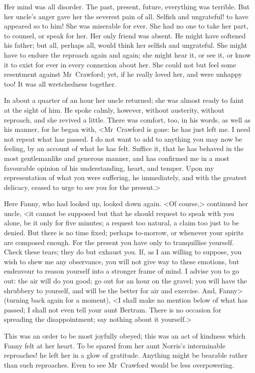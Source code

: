 Her mind was all disorder. The past, present, future, everything was terrible. But her uncle's anger gave her the severest pain of all. Selfish and ungrateful! to have appeared so to him! She was miserable for ever. She had no one to take her part, to counsel, or speak for her. Her only friend was absent. He might have softened his father; but all, perhaps all, would think her selfish and ungrateful. She might have to endure the reproach again and again; she might hear it, or see it, or know it to exist for ever in every connexion about her. She could not but feel some resentment against Mr~Crawford; yet, if he really loved her, and were unhappy too! It was all wretchedness together.

In about a quarter of an hour her uncle returned; she was almost ready to faint at the sight of him. He spoke calmly, however, without austerity, without reproach, and she revived a little. There was comfort, too, in his words, as well as his manner, for he began with, <Mr~Crawford is gone: he has just left me. I need not repeat what has passed. I do not want to add to anything you may now be feeling, by an account of what he has felt. Suffice it, that he has behaved in the most gentlemanlike and generous manner, and has confirmed me in a most favourable opinion of his understanding, heart, and temper. Upon my representation of what you were suffering, he immediately, and with the greatest delicacy, ceased to urge to see you for the present.>

Here Fanny, who had looked up, looked down again. <Of course,> continued her uncle, <it cannot be supposed but that he should request to speak with you alone, be it only for five minutes; a request too natural, a claim too just to be denied. But there is no time fixed; perhaps to-morrow, or whenever your spirits are composed enough. For the present you have only to tranquillise yourself. Check these tears; they do but exhaust you. If, as I am willing to suppose, you wish to shew me any observance, you will not give way to these emotions, but endeavour to reason yourself into a stronger frame of mind. I advise you to go out: the air will do you good; go out for an hour on the gravel; you will have the shrubbery to yourself, and will be the better for air and exercise. And, Fanny> (turning back again for a moment), <I shall make no mention below of what has passed; I shall not even tell your aunt Bertram. There is no occasion for spreading the disappointment; say nothing about it yourself.>

This was an order to be most joyfully obeyed; this was an act of kindness which Fanny felt at her heart. To be spared from her aunt Norris's interminable reproaches! he left her in a glow of gratitude. Anything might be bearable rather than such reproaches. Even to see Mr~Crawford would be less overpowering.

